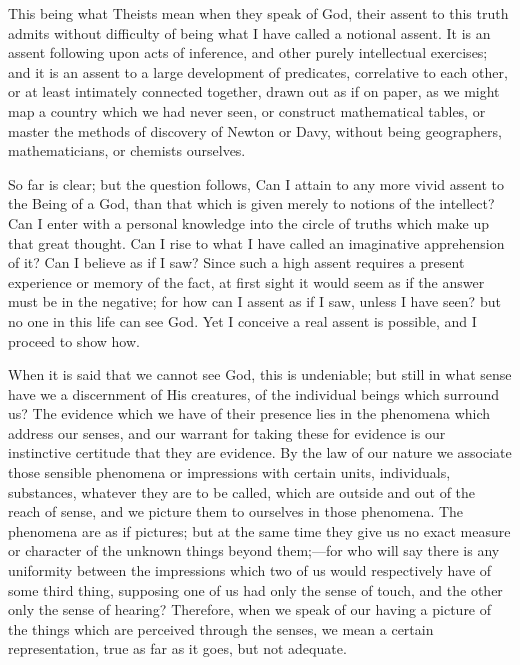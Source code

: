 This being what Theists mean when they speak of God, their
assent to this truth admits without difficulty of being what I have
called a notional assent. It is an assent following upon acts of
inference, and other purely intellectual exercises; and it is an
assent to a large development of predicates, correlative to each
other, or at least intimately connected together, drawn out as if on
paper, as we might map a country which we had never seen, or construct
mathematical tables, or master the methods of discovery of Newton or
Davy, without being geographers, mathematicians, or chemists
ourselves.

So far is clear; but the question follows, Can I attain to any more
vivid assent to the Being of a God, than that which is given merely to
notions of the intellect? Can I enter with a personal knowledge into
the circle of truths which make up that great thought. Can I rise to
what I have called an imaginative apprehension of it? Can I believe as
if I saw? Since such a high assent requires a present experience or
memory of the fact, at first sight it would seem as if the answer must
be in the negative; for how can I assent as if I saw, unless I have
seen? but no one in this life can see God. Yet I conceive a real
assent is possible, and I proceed to show how.

When it is said that we cannot see God, this is undeniable; but
still in what sense have we a discernment of His creatures, of the
individual beings which surround us? The evidence which we have of
their presence lies in the phenomena which address our senses, and our
warrant for taking these for evidence is our instinctive certitude
that they are evidence. By the law of our nature we associate those
sensible phenomena or impressions with certain units,
individuals, substances, whatever they are to be called, which are
outside and out of the reach of sense, and we picture them to
ourselves in those phenomena. The phenomena are as if pictures; but at
the same time they give us no exact measure or character of the
unknown things beyond them;—for who will say there is any uniformity
between the impressions which two of us would respectively have of
some third thing, supposing one of us had only the sense of touch, and
the other only the sense of hearing? Therefore, when we speak of our
having a picture of the things which are perceived through the senses,
we mean a certain representation, true as far as it goes, but not
adequate.

